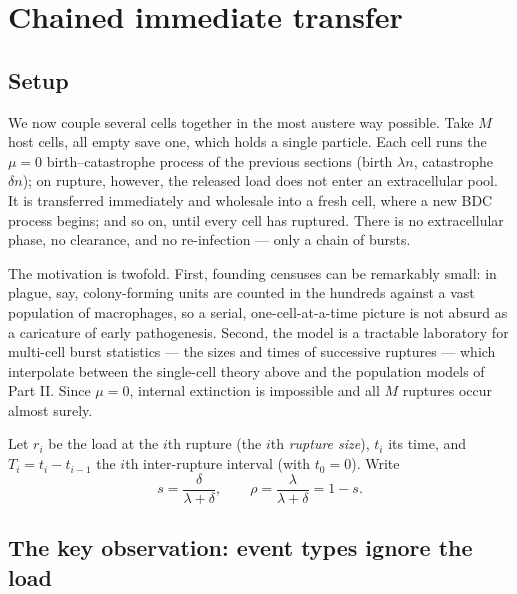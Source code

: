 
\section{Chained immediate transfer}
\label{sec:chained}

\subsection{Setup}

We now couple several cells together in the most austere way possible. Take
$M$ host cells, all empty save one, which holds a single particle. Each cell
runs the $\mu=0$ birth--catastrophe process of the previous sections (birth
$\lambda n$, catastrophe $\delta n$); on rupture, however, the released load
does not enter an extracellular pool. It is transferred immediately and
wholesale into a fresh cell, where a new BDC process begins; and so on,
until every cell has ruptured. There is no extracellular phase, no
clearance, and no re-infection --- only a chain of bursts.

The motivation is twofold. First, founding censuses can be remarkably small:
in plague, say, colony-forming units are counted in the hundreds against a
vast population of macrophages, so a serial, one-cell-at-a-time picture is
not absurd as a caricature of early pathogenesis. Second, the model is a
tractable laboratory for multi-cell burst statistics --- the sizes and times
of successive ruptures --- which interpolate between the single-cell theory
above and the population models of Part II. Since $\mu=0$, internal
extinction is impossible and all $M$ ruptures occur almost surely.

Let $r_i$ be the load at the $i$th rupture (the $i$th \emph{rupture size}),
$t_i$ its time, and $T_i=t_i-t_{i-1}$ the $i$th inter-rupture interval
(with $t_0=0$). Write
\begin{equation}
s=\frac{\delta}{\lambda+\delta},
\qquad
\rho=\frac{\lambda}{\lambda+\delta}=1-s.
\end{equation}

\subsection{The key observation: event types ignore the load}
\label{sec:key-observation}

